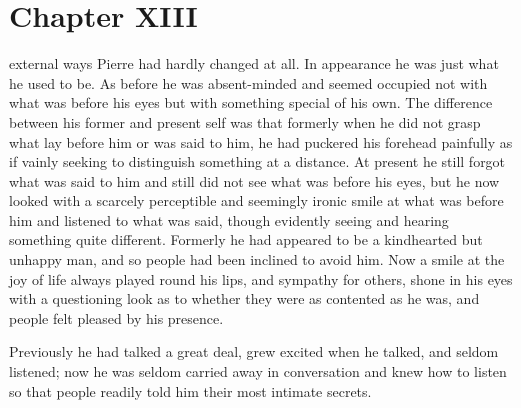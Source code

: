 
\chapter*{Chapter XIII}
\ifaudio 
{}
\fi

 external ways Pierre had hardly changed at all. In appearance
he was just what he used to be. As before he was absent-minded
and seemed occupied not with what was before his eyes but with
something special of his own. The difference between his former
and present self was that formerly when he did not grasp what lay
before him or was said to him, he had puckered his forehead
painfully as if vainly seeking to distinguish something at a
distance. At present he still forgot what was said to him and
still did not see what was before his eyes, but he now looked
with a scarcely perceptible and seemingly ironic smile at what
was before him and listened to what was said, though evidently
seeing and hearing something quite different. Formerly he had
appeared to be a kindhearted but unhappy man, and so people had
been inclined to avoid him. Now a smile at the joy of life always
played round his lips, and sympathy for others, shone in his eyes
with a questioning look as to whether they were as contented as
he was, and people felt pleased by his presence.

Previously he had talked a great deal, grew excited when he
talked, and seldom listened; now he was seldom carried away in
conversation and knew how to listen so that people readily told
him their most intimate secrets.

